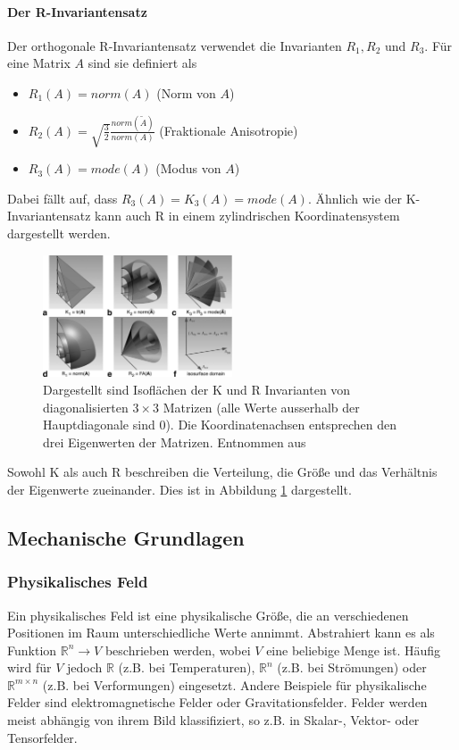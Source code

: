 \documentclass[a4paper,fontsize=12pt,toc=bib,halfparskip]{scrartcl}
\begin{document}
\paragraph{Der R-Invariantensatz}
Der orthogonale R-Invariantensatz verwendet die Invarianten $R_1, R_2$ und $R_3$. F\"ur eine Matrix $A$ sind sie definiert als

\begin{itemize}
	\item $R_1(A)=norm(A)$ (Norm von $A$)
	\item $R_2(A)=\sqrt{\frac{3}{2}} \frac{norm(\tilde{A})}{norm(A)}$ (Fraktionale Anisotropie)
	\item $R_3(A)=mode(A)$ (Modus von $A$)
\end{itemize}

Dabei f\"allt auf, dass $R_3(A) = K_3(A) = mode(A)$. \"Ahnlich wie der K-Invariantensatz kann auch R in einem zylindrischen Koordinatensystem dargestellt werden.

\begin{figure}
	\centering
	\includegraphics[width=0.5\textwidth]{pictures/-000.png}
	\caption{Dargestellt sind Isofl\"achen der K und R Invarianten von diagonalisierten $3\times 3$ Matrizen (alle Werte ausserhalb der Hauptdiagonale sind 0). Die Koordinatenachsen entsprechen den drei Eigenwerten der Matrizen. Entnommen aus \cite[S.~139]{ennis2006orthogonal}}
	\label{KRInvariants}
\end{figure}

Sowohl K als auch R beschreiben die Verteilung, die Gr\"o{\ss}e und das Verh\"altnis der Eigenwerte zueinander. Dies ist in Abbildung \ref{KRInvariants} dargestellt. 


\subsection{Mechanische Grundlagen}
\subsubsection{Physikalisches Feld}
Ein physikalisches Feld ist eine physikalische Gr\"o{\ss}e, die an verschiedenen Positionen im Raum unterschiedliche Werte annimmt\cite[1–2 Electric and magnetic fields]{feynman2011feynman}. Abstrahiert kann es als Funktion $\mathbb{R}^n \rightarrow V$ beschrieben werden, wobei $V$ eine beliebige Menge ist. H\"aufig wird f\"ur $V$ jedoch $\mathbb{R}$ (z.B. bei Temperaturen), $\mathbb{R}^n$ (z.B. bei Str\"omungen) oder $\mathbb{R}^{m\times n}$ (z.B. bei Verformungen) eingesetzt. Andere Beispiele f\"ur physikalische Felder sind elektromagnetische Felder oder Gravitationsfelder. Felder werden meist abh\"angig von ihrem Bild klassifiziert, so z.B. in Skalar-, Vektor- oder Tensorfelder.
\end{document}
